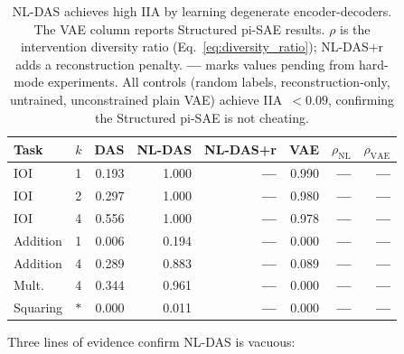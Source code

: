 \documentclass{article}
\begin{document}
\begin{table}[t]
\centering
\small
\setlength{\tabcolsep}{3pt}
\begin{tabular}{lc rrrr rr}
\toprule
Task & $k$ & DAS & NL-DAS & NL-DAS+r & VAE & $\rho_\text{NL}$ & $\rho_\text{VAE}$ \\
\midrule
IOI & 1 & 0.193 & 1.000 & \textbf{---} & 0.990 & \textbf{---} & \textbf{---} \\
IOI & 2 & 0.297 & 1.000 & \textbf{---} & 0.980 & \textbf{---} & \textbf{---} \\
IOI & 4 & 0.556 & 1.000 & \textbf{---} & 0.978 & \textbf{---} & \textbf{---} \\
Addition & 1 & 0.006 & 0.194 & \textbf{---} & 0.000 & \textbf{---} & \textbf{---} \\
Addition & 4 & 0.289 & 0.883 & \textbf{---} & 0.089 & \textbf{---} & \textbf{---} \\
Mult.\ & 4 & 0.344 & 0.961 & \textbf{---} & 0.000 & \textbf{---} & \textbf{---} \\
Squaring & $*$ & 0.000 & 0.011 & \textbf{---} & 0.000 & \textbf{---} & \textbf{---} \\
\bottomrule
\end{tabular}
\caption{NL-DAS achieves high IIA by learning degenerate encoder-decoders.
  The VAE column reports Structured pi-SAE results.
  $\rho$ is the intervention diversity ratio (Eq.~\ref{eq:diversity_ratio});
  NL-DAS+r adds a reconstruction penalty.
  \textbf{---} marks values pending from hard-mode experiments.
  All controls (random labels, reconstruction-only, untrained, unconstrained
  plain VAE) achieve IIA~$< 0.09$, confirming the Structured pi-SAE is not
  cheating.}
\label{tab:nldas_vacuous}
\end{table}

Three lines of evidence confirm NL-DAS is vacuous:
\end{document}
